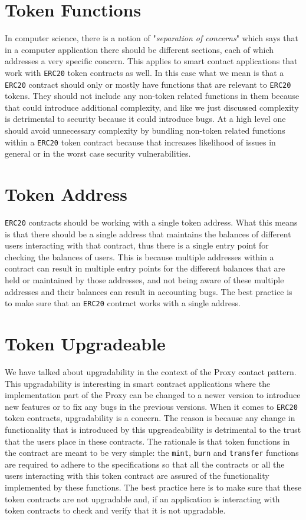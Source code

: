 \section{Token Functions}
In computer science, there is a notion of "\textit{separation of concerns}" which says that in a computer application there should be different sections, each of which addresses a very specific concern. This applies to smart contact applications that work with \verb|ERC20| token contracts as well. In this case what we mean is that a \verb|ERC20| contract should only or mostly have functions that are relevant to \verb|ERC20| tokens. They should not include any non-token related functions in them because that could introduce additional complexity, and like we just discussed complexity is detrimental to security because it could introduce bugs. At a high level one should avoid unnecessary complexity by bundling non-token related functions within a \verb|ERC20| token contract because that increases likelihood of issues in general or in the worst case security vulnerabilities.

\section{Token Address}
\verb|ERC20| contracts should be working with a single token address. What this means is that there should be a single address that maintains the balances of different users interacting with that contract, thus there is a single entry point for checking the balances of users. This is because multiple addresses within a contract can result in multiple entry points for the different balances that are held or maintained by those addresses, and not being aware of these multiple addresses and their balances can result in accounting bugs. The best practice is to make sure that an \verb|ERC20| contract works with a single address.

\section{Token Upgradeable}
We have talked about upgradability in the context of the Proxy contact pattern. This upgradability is interesting in smart contract applications where the implementation part of the Proxy can be changed to a newer version to introduce new features or to fix any bugs in the previous versions. When it comes to \verb|ERC20| token contracts, upgradability is a concern. The reason is because any change in functionality that is introduced by this upgreadeability is detrimental to the trust that the users place in these contracts. The rationale is that token functions in the contract are meant to be very simple: the \verb|mint|, \verb|burn| and \verb|transfer| functions are required to adhere to the specifications so that all the contracts or all the users interacting with this token contract are assured of the functionality implemented by these functions. The best practice here is to make sure that these token contracts are not upgradable and, if an application is interacting with token contracts to check and verify that it is not upgradable.


